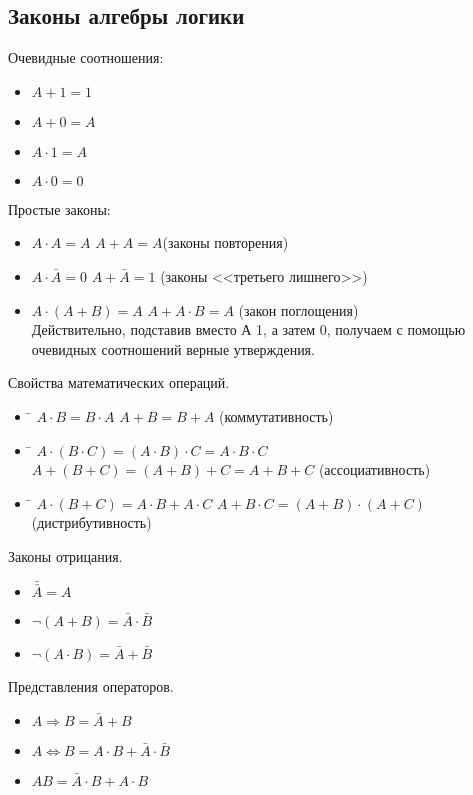\subsection*{Законы алгебры логики}
Очевидные соотношения:
\begin{itemize}
	\item $A+1 = 1$
	\item $A+0=A$
	\item $A\cdot1=A$
	\item $A\cdot0=0$
\end{itemize}
Простые законы:
\begin{itemize}
	\item $A\cdot A = A$ \qquad $ A + A = A$(законы повторения)
	\item $A\cdot\bar{A}=0$ \qquad $A + \bar{A} = 1$ (законы <<третьего лишнего>>)
	\item $A\cdot(A+B)=A$ $A+A\cdot B=A$ (закон поглощения)\\
	Действительно, подставив вместо А 1, а затем 0, получаем с помощью очевидных соотношений верные утверждения.
\end{itemize}
Свойства математических операций.
\begin{itemize}
	\item \begin{tabbing}
		\hspace{6cm}\=\kill
		$A\cdot B=B\cdot A$ \> $A+B=B+A$ (коммутативность)
	\end{tabbing}
	\item \begin{tabbing}
		\hspace{6cm}\=\kill
		$A\cdot(B\cdot C)= (A\cdot B)\cdot C = A\cdot B\cdot C$ \> $A+(B+C)=(A+B)+C=A+B+C$ (ассоциативность)
	\end{tabbing}
	\item \begin{tabbing}
		\hspace{6cm}\=\kill
		$A\cdot(B+C)=A\cdot B+A\cdot C$ \> $A+B\cdot C = (A+B)\cdot(A+C)$  (дистрибутивность)
	\end{tabbing}	
\end{itemize}
Законы отрицания.
\begin{itemize}
	\item $\bar{\bar{A}}=A$
	\item $\neg(A+B)=\bar{A}\cdot\bar{B}$
	\item $\neg(A\cdot B)=\bar{A}+\bar{B}$
\end{itemize}
Представления операторов.
\begin{itemize}
	\item $A \Rightarrow B = \bar{A} + B$
	\item $A \Leftrightarrow B = A\cdot B + \bar{A}\cdot \bar{B}$
	\item $A B = \bar{A}\cdot B + A\cdot B$
\end{itemize}


